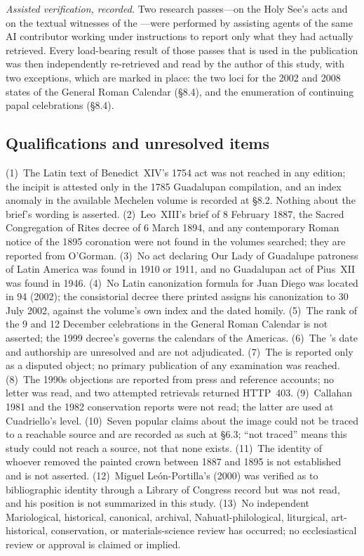 \emph{Assisted verification, recorded.} Two research passes---on the
Holy See's acts and on the textual witnesses of the ---were performed by assisting agents of the same AI
contributor working under instructions to report only what they had
actually retrieved. Every load-bearing result of those passes that is
used in the publication was then independently re-retrieved and read
by the author of this study, with two exceptions, which are marked in
place: the two  loci for the 2002 and 2008 states of
the General Roman Calendar (\S8.4), and the enumeration of continuing
papal celebrations (\S8.4).

\subsection*{Qualifications and unresolved items}

(1)~The Latin text of Benedict~XIV's 1754 act was not reached in any
edition; the incipit  is attested only in the
1785 Guadalupan compilation, and an index anomaly in the available
Mechelen  volume is recorded at \S8.2. Nothing about
the brief's wording is asserted. (2)~Leo~XIII's brief of 8 February
1887, the Sacred Congregation of Rites decree of 6 March 1894, and any
contemporary Roman notice of the 1895 coronation were not found in the
 volumes searched; they are reported from
O'Gorman. (3)~No act declaring Our Lady of Guadalupe patroness of Latin
America was found in  1910 or 1911, and no Guadalupan act of
Pius~XII was found in  1946. (4)~No Latin canonization
formula for Juan Diego was located in  94 (2002); the
consistorial decree there printed assigns his canonization to 30 July
2002, against the volume's own index and the dated homily. (5)~The
rank of the 9 and 12 December celebrations in the General Roman
Calendar is not asserted; the 1999 decree's  governs
the calendars of the Americas. (6)~The 's date and
authorship are unresolved and are not adjudicated. (7)~The
 is reported only as a disputed object; no
primary publication of any examination was reached. (8)~The 1990s
objections are reported from press and reference accounts; no letter
was read, and two attempted retrievals returned HTTP~403. (9)~Callahan
1981 and the 1982 conservation reports were not read; the latter are
used at Cuadriello's level. (10)~Seven popular claims about the image
could not be traced to a reachable source and are recorded as such at
\S6.3; ``not traced'' means this study could not reach a source, not
that none exists. (11)~The identity of whoever removed the painted
crown between 1887 and 1895 is not established and is not asserted.
(12)~Miguel Le\'on-Portilla's  (2000) was
verified as to bibliographic identity through a Library of Congress
record but was not read, and his position is not summarized in this
study. (13)~No independent Mariological, historical, canonical,
archival, Nahuatl-philological, liturgical, art-historical, conservation,
or materials-science review has occurred; no ecclesiastical review or
approval is claimed or implied.

